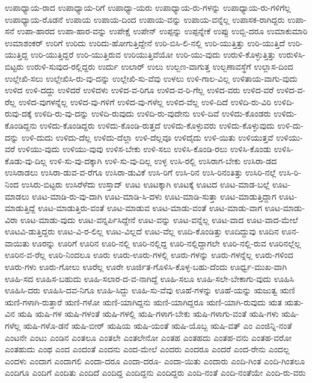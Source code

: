 {ಉಪಾಧ್ಯಾಯ-ರಾದ
ಉಪಾಧ್ಯಾಯ-ರಿಗೆ
ಉಪಾಧ್ಯಾ-ಯರು
ಉಪಾಧ್ಯಾಯ-ರು-ಗಳನ್ನು
ಉಪಾಧ್ಯಾಯ-ರು-ಗಳಿಗೆಲ್ಲ
ಉಪಾಧ್ಯಾಯ-ರೊಡನೆ
ಉಪಾಯ
ಉಪಾಯ-ದಿಂದ
ಉಪಾಯ-ವನ್ನು
ಉಪಾಯ-ವನ್ನೆಲ್ಲ
ಉಪಾಸಕ-ರಾಗಿದ್ದರು
ಉಪಾ-ಸನೆ
ಉಪಾ-ಹಾರದ
ಉಪಾ-ಹಾರ-ವನ್ನು
ಉಪೇಕ್ಷೆ
ಉಪೇನ್
ಉಪ್ಪನ್ನು
ಉಪ್ಪನ್ನೇಕೆ
ಉಪ್ಪು
ಉಬ್ಬಿ-ದರೂ
ಉಮಾಕುಮಾರಿ
ಉಮಾಶಂಕರ್
ಉರಿಗೆ
ಉರಿದು
ಉರಿದು-ಹೋಗುತ್ತಿದ್ದೇನೆ
ಉರಿ-ಬಿಸಿ-ಲಿ-ನಲ್ಲಿ
ಉರಿ-ಯುತ್ತಿತ್ತು
ಉರಿ-ಯುತ್ತಿದೆ
ಉರಿ-ಯುತ್ತಿದ್ದ
ಉರಿ-ಯುತ್ತಿದ್ದರೆ
ಉರಿ-ಯುತ್ತಿರುವ
ಉರಿಯುತ್ತಿವೆಯೋ
ಉರಿ-ಯು-ವುದು
ಉರುಳಿ-ಕೊಳ್ಳುತ್ತಿತ್ತು
ಉರುಳಿಸಿ-ಬಿಟ್ಟರು
ಉರುಳಿ-ಸುವುದ-ರಲ್ಲಿದ್ದರು
ಉರ್ದು
ಉಲಾರ್
ಉಲು
ಉಲ್ಬಣ-ವಾಗುತ್ತ
ಉಲ್ಬಣಾವಸ್ಥೆಗೆ
ಉಲ್ಲಾಸ-ದಿಂದ
ಉಲ್ಲೇಖಿ-ಸಲು
ಉಲ್ಲೇಖಿಸಿ-ರು-ವು-ದನ್ನು
ಉಲ್ಲೇಖಿ-ಸು-ವೆವು
ಉಳಲು
ಉಳಿ-ಗಾಲ-ವಿಲ್ಲ
ಉಳಿತಾಯ-ವಾಗು-ವುದು
ಉಳಿದ
ಉಳಿ-ದದ್ದು
ಉಳಿದರೆ
ಉಳಿದಳು
ಉಳಿದ-ವ-ರಿಗೂ
ಉಳಿದ-ವ-ರಿ-ಗೆಲ್ಲ
ಉಳಿದ-ವರು
ಉಳಿದ-ವರೆ
ಉಳಿದ-ವ-ರೆಲ್ಲ
ಉಳಿದ-ವುಗಳನ್ನೆಲ್ಲ
ಉಳಿದ-ವು-ಗಳಿಗೆ
ಉಳಿದ-ವು-ಗಳೆಲ್ಲ
ಉಳಿದ-ವೆಲ್ಲ
ಉಳಿ-ದಿದೆ
ಉಳಿದಿ-ರು-ವಿರಿ
ಉಳಿದಿ-ರುವು-ದಕ್ಕೆ
ಉಳಿದಿ-ರು-ವು-ದನ್ನು
ಉಳಿದಿ-ರುವುದು
ಉಳಿದಿ-ರು-ವುದೇನು
ಉಳಿ-ದಿವೆ
ಉಳಿದು-ಕೊಂಡರು
ಉಳಿದು-ಕೊಂಡಿದ್ದನು
ಉಳಿದು-ಕೊಂಡಿದ್ದರು
ಉಳಿದು-ಕೊಂಡಿ-ರುತ್ತದೆ
ಉಳಿದು-ಕೊಳ್ಳುವರು
ಉಳಿದು-ಕೊಳ್ಳುವುದು
ಉಳಿ-ದು-ದನ್ನು
ಉಳಿ-ದುದು
ಉಳಿದು-ದೆಲ್ಲ
ಉಳಿದು-ದೆಲ್ಲಾ
ಉಳಿ-ದೆಲ್ಲವೂ
ಉಳಿದೈದು
ಉಳಿ-ಯಿತು
ಉಳಿಯುತ್ತವೆ
ಉಳಿಯು-ವರೆ
ಉಳಿಯು-ವುದು
ಉಳಿಯು-ವುವು
ಉಳಿಸ-ಬೇಕು
ಉಳಿ-ಸಲು
ಉಳಿಸಿ-ಕೊಂಡಿ-ರಲು
ಉಳಿಸಿ-ಕೊಂಡು
ಉಳಿಸಿ-ಕೊಡು-ವು-ದಿಲ್ಲ
ಉಳಿ-ಸು-ವು-ದಕ್ಕಾಗಿ
ಉಳಿ-ಸು-ವು-ದಿಲ್ಲ
ಉಳ್ಳ
ಉಸಿ-ರಲ್ಲಿ
ಉಸಿರಾಗ-ಬೇಕು
ಉಸಿರಾ-ಡದ
ಉಸಿರಾಡಲು
ಉಸಿರಾ-ಡುವ-ವ-ರೆಗೂ
ಉಸಿರಾ-ಡುವಿಕೆ
ಉಸಿ-ರಿಗೆ
ಉಸಿ-ರಿನ
ಉಸಿ-ರಿನಂತಿತ್ತು
ಉಸಿರಿ-ನಲ್ಲೆ
ಉಸಿ-ರಿ-ನಿಂದ
ಉಸಿರು-ಬಿಟ್ಟರು
ಉಸಿರೆಳೆದು
ಉಸ್ತಾದ್
ಊಟ
ಊಟಕ್ಕಾಗಿ
ಊಟಕ್ಕೆ
ಊಟದ
ಊಟ-ಮಾಡ-ಬಲ್ಲೆ
ಊಟ-ಮಾಡಲು
ಊಟ-ಮಾಡಿ-ರು-ವು-ದಾಗಿ
ಊಟ-ಮಾಡಿ-ಸಿ-ದಳು
ಊಟ-ಮಾಡಿ-ಸುತ್ತಾ
ಊಟ-ಮಾಡುತ್ತಿದ್ದಾಗ
ಊಟ-ಮಾಡುತ್ತಿದ್ದೆ
ಊಟ-ಮಾಡುತ್ತಿರು-ವಂತೆ
ಊಟ-ಮಾಡುವ
ಊಟ-ಮಾಡು-ವಂತೆ
ಊಟ-ಮಾಡು-ವಾಗ
ಊಟ-ಮಾಡು-ವಿರಾ
ಊಟ-ಮಾಡು-ವುದು
ಊಟ-ವನ್ನರ್ಪಿಸಿದ್ದೇನೆ
ಊಟ-ವನ್ನು
ಊಟ-ವನ್ನೆಲ್ಲ
ಊಟ-ವಾದ
ಊಟ-ವಾದ-ಮೇಲೆ
ಊಟವಿ-ಡುತ್ತಿದ್ದರು
ಊಟ-ವಿ-ರ-ಲಿಲ್ಲ
ಊಟ-ವಿಲ್ಲದೆ
ಊಟ-ವೆಲ್ಲ
ಊದಿ-ಕೊಂಡಿತ್ತು
ಊದಿದ್ದುವು
ಊದಿನ
ಊನ-ವಾಯಿತು
ಊರನ್ನು
ಊರಿಗೆ
ಊರಿನ
ಊರಿ-ನಲ್ಲಿ
ಊರಿ-ನಲ್ಲಿದ್ದ
ಊರಿ-ನಲ್ಲಿದ್ದಾಗಲೇ
ಊರಿ-ನಲ್ಲಿ-ರುವ
ಊರಿನಲ್ಲೆಲ್ಲ
ಊರಿನ-ವ-ರೆಲ್ಲ
ಊರಿ-ನಿಂದಲೂ
ಊರು
ಊರು-ಊರು-ಗಳಲ್ಲಿ
ಊರು-ಗಳನ್ನು
ಊರು-ಗಳನ್ನೆಲ್ಲ
ಊರು-ಗಳಿಂದ
ಊರು-ಗಳು
ಊರು-ಗೋಲು
ಊರೆಲ್ಲ
ಊರೇ
ಊರ್ಜಿತ-ಗೊಳಿಸಿ-ಕೊಳ್ಳ-ಬಹು-ದೆಂದು
ಊರ್ಧ್ವ-ಮುಖ-ವಾಗಿ
ಊಹಿ-ಸದ
ಊಹಿಸ-ಬಹುದು
ಊಹಿ-ಸಲಾರ-ದ-ವ-ನಾಗಿದ್ದೆ
ಊಹಿ-ಸಲೂ
ಊಹಿ-ಸಲೇ-ಬೇಕಾಗು-ವುದು
ಊಹಿಸಿ
ಊಹಿಸಿ-ದರು
ಊಹಿಸಿ-ದವ-ನಿಗೂ
ಊಹಿ-ಸಿದ್ದು
ಊಹಿ-ಸು-ವೆವು
ಊಹೆ-ಗಳನ್ನು
ಊಹೆ-ಯನ್ನು
ಋಜುತ್ವ
ಋಣಿ
ಋಣಿ-ಗಳಾಗಿ-ರುತ್ತಾರೆ
ಋಣಿ-ಗಳೋ
ಋಣಿ-ಯಾಗಿದ್ದನು
ಋಣಿ-ಯಾಗಿದ್ದರೂ
ಋಣಿ-ಯಾಗಿ-ರುವುದು
ಋತ
ಋತು-ವಿನ
ಋಷಿ
ಋಷಿ-ಗಳ
ಋಷಿ-ಗಳಂತೆ
ಋಷಿ-ಗಳಲ್ಲಿ
ಋಷಿ-ಗಳಾಗ-ಬೇಕು
ಋಷಿ-ಗಳಾಗು-ವಂತೆ
ಋಷಿ-ಗಳು
ಋಷಿ-ಗಳೆಲ್ಲ
ಋಷಿ-ಗಳೊ-ಡನೆ
ಋಷಿ-ಬೀರ್
ಋಷಿಯ
ಋಷಿ-ಯಂತೆ
ಋಷಿ-ಯೊಬ್ಬ
ಋಷಿ-ವತ್
ಎಂ
ಎಂಜಿನ್ನಿ-ನಂತೆ
ಎಂಟನೇ
ಎಂಟು
ಎಂಡಿನ
ಎಂತಲೂ
ಎಂತಲೇ
ಎಂತಲೇನೋ
ಎಂತಹ
ಎಂತಹದು
ಎಂತಹ-ವನು
ಎಂತಹ-ವರೋ
ಎಂತಹುದು
ಎಂಥ
ಎಂದ
ಎಂದಂತೆ
ಎಂದನು
ಎಂದ-ಮೇಲೆ
ಎಂದರು
ಎಂದರೂ
ಎಂದರೆ
ಎಂದ-ರೇನು
ಎಂದಲ್ಲ
ಎಂದಳು
ಎಂದಾಗ
ಎಂದಾಗಲಿ
ಎಂದಾ-ದರೂ
ಎಂದಾ-ದರೂ-
ಎಂದಾ-ಯಿತು
ಎಂದಾರು
ಎಂದಿ-ಗಿಂತ
ಎಂದಿ-ಗಿಂತಲೂ
ಎಂದಿಗೂ
ಎಂದಿಗೆ
ಎಂದಿತು
ಎಂದಿದೆ
ಎಂದಿದ್ದ
ಎಂದಿದ್ದನು
ಎಂದಿದ್ದರು
ಎಂದಿ-ನಂತೆ
ಎಂದಿ-ನಂತೆಯೇ
ಎಂದಿ-ರು-ವರು
}
